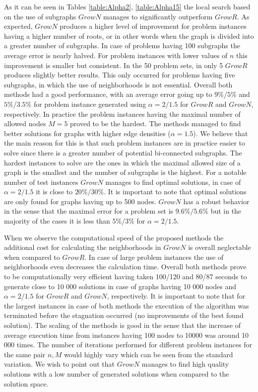 As it can be seen in Tables \ref{table:Alpha2}, \ref{table:Alpha15} the local search based on the use of subgraphs $GrowN$ manages to significantly outperform $GrowR$. As expected, $GrowN$ produces a higher level of improvement for problem instances having a higher number of roots, or in other words when the  graph is divided into a greater number of subgraphs. In case of problems having 100 subgraphs the  average error is nearly halved. For problem instances with lower values of $n$ this improvement is smaller but consistent. In the 50 problem sets, in only 5 $GrowR$ produces slightly better results. This only occurred for problems having five subgraphs, in which the use of neighborhoods is not essential. Overall both methods had a good performance, with an average error going up to $9\%$/$5\%$ and $5\%$/$3.5\%$ for problem instance generated using $\alpha = 2/1.5$ for $GrowR$ and $GrowN$, respectively. In practice the problem instances having the maximal number of allowed nodes $M = 5$ proved to be the hardest. The methods managed to find better solutions for  graphs with higher edge densities ($\alpha = 1.5$). We believe that the main reason for this is that such problem instances are in practice easier to solve since there is a greater number of potential bi-connected subgraphs.  The hardest instances to solve are the ones in which the maximal allowed size of a graph is the smallest and the number of subgraphs is the highest. For a notable number of test instances $GrowN$ manages to find optimal solutions, in case of $\alpha = 2/1.5$ it is close to $20\% / 30\%$. It is important to note that optimal solutions are only found for graphs having up to 500 nodes. $GrowN$ has a robust behavior in the sense that the maximal error for a problem set  is $9.6\% / 5.6 \%$ but in the majority of the cases it is less than $5\% /3\%$ for $\alpha = 2/1.5$.

When we observe the computational speed of the proposed methods the additional cost for calculating the neighborhoods in $GrowN$ is overall neglectable  when compared to $GrowR$. In case of large problem instances the use of neighborhoods even decreases the calculation time. Overall both methods prove to be computationally  very efficient having taken  100/120 and 80/87 seconds to generate close to 10 000 solutions in case of graphs having 10 000 nodes and $\alpha = 2/1.5$ for $GrowR$ and $GrowN$, respectively. It is important to note that for the largest instances in case of both methods the execution of the algorithm was terminated before the stagnation occurred (no improvements of the best found solution). The scaling of the methods is good in the sense that the increase of average execution time from instances having 100 nodes to 10000 was around 10 000 times. The number of iterations performed for different problem instances for the same pair $n,M$ would highly vary which can be seen from the standard variation. We wish to point out that  $GrowN$ manages to find high quality solutions with a  low number of generated solutions when compared to the solution space. 

